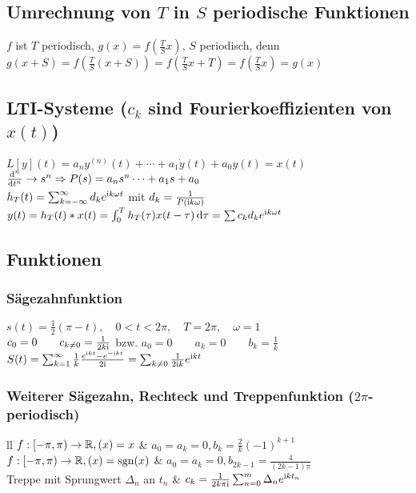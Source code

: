 \documentclass[german,color,5pt]{latex4ei/latex4ei_fs}
\begin{document}
\begin{sectionbox}
	\subsection{Umrechnung von $T$ in $S$ periodische Funktionen}
	$f$ ist $T$ periodisch, $g(x) = f\left( \frac{T}{S} x \right)$, $S$ periodisch, denn
	$g(x+S) = f\left( \frac{T}{S} (x+S) \right) = f\left( \frac{T}{S} x + T \right) = f\left( \frac{T}{S} x \right) = g(x)$\\
\end{sectionbox}

\begin{sectionbox}
	\subsection{LTI-Systeme ($c_k$ sind Fourierkoeffizienten von $x(t)$) }
	$L[y](t) = a_n y^{(n)}(t) + \cdots + a_1 \dot{y}(t) + a_0 y(t) = x(t)$\\
	$\frac{\diff^n}{\diff t^n} \ra s^n \Ra P(s) = a_n s^n \cdots + a_1 s + a_0$\\
	$h_T(t) = \sum_{k=-\infty}^{\infty}d_k e^{\mathrm{i} k \omega t}$ mit $d_k = \frac{1}{P(\mathrm{i} k \omega)}$\\
	$y(t) = h_T(t)*x(t) = \int_0^T h_T(\tau) x(t - \tau) \diff \tau = \sum c_k d_k e^{\i k\omega t}$
	
\end{sectionbox}

\begin{sectionbox}
	\subsection{Funktionen}
	\subsubsection{Sägezahnfunktion}
	$s(t) = \frac{1}{2}(\pi - t), \quad 0 < t < 2 \pi, \quad T = 2 \pi, \quad \omega = 1$\\
	$c_0 = 0 \qquad c_{k\ne 0} = \frac{1}{2k \mathrm{i}}$ \quad bzw. \quad $ a_0 = 0 \qquad a_k=0 \qquad b_k=\frac{1}{k}$\\
	$S(t) = \sum_{k=1}^{\infty}\frac{1}{k}\frac{e^{\mathrm{i} k t} - e^{-\mathrm{i} k t}}{2 \mathrm{i}} = \sum_{k\ne 0}\frac{1}{2\mathrm{i} k}e^{\mathrm{i} k t}$
	\subsubsection{Weiterer Sägezahn, Rechteck und Treppenfunktion ($2\pi$-periodisch)}
	\begin{tablebox}{ll}
		$f:[-\pi,\pi) \rightarrow \mathbb{R}, (x)=x$ & $a_0=a_k=0, b_k=\frac{2}{k}(-1)^{k+1}$ \\
		$f:[-\pi,\pi) \rightarrow \mathbb{R}, (x)=\operatorname{sgn}(x)$ & $a_0=a_k=0, b_{2k-1}=\frac{4}{(2k-1)\pi}$ \\
		Treppe mit Sprungwert $\Delta_n$ an $t_n$ & $c_k=\frac{1}{2k\pi\mathrm{i}}\sum_{n=0}^{m}\Delta_n e^{\mathrm{i} k t_n}$
	\end{tablebox}
\end{sectionbox}
\end{document}
